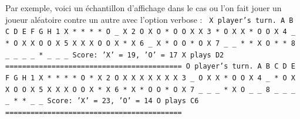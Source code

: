 \documentclass{report}
\begin{document}
Par exemple, voici un échantillon d'affichage dans le cas ou l'on fait jouer un joueur aléatoire contre un autre avec l'option verbose :\newline
\texttt{\newline
X player's turn.\newline
\newline
\tabto{1 cm}A B C D E F G H
\tabto{0.62 cm}  1 X * * * * O \_ X \newline
\tabto{0.62 cm}  2 O X O * O O X X \newline
\tabto{0.62 cm}  3 * O X X * O O X \newline
\tabto{0.62 cm}  4 \_ * O X X O O X \newline
\tabto{0.62 cm}  5 X X X O O X * X \newline
\tabto{0.62 cm}  6 \_ X * O O * O X \newline
\tabto{0.62 cm}  7 \_ \_ * * X O * * \newline
\tabto{0.62 cm}  8 \_ \_ \_ \_ * \_ \_ \_ \newline
\newline
Score: 'X' = 19, 'O' = 17\newline
\newline
X plays D2\newline
==========================================\newline
\newline
O player's turn.\newline
\newline
\tabto{1 cm}A B C D E F G H
\tabto{0.62 cm}  1 X * * * * O * X \newline
\tabto{0.62 cm}  2 O X X X X X X X \newline
\tabto{0.62 cm}  3 \_ O X X * O O X \newline
\tabto{0.62 cm}  4 \_ * O X X O O X \newline
\tabto{0.62 cm}  5 X X X O O X * X \newline
\tabto{0.62 cm}  6 * X * O O * O X \newline
\tabto{0.62 cm}  7 \_ \_ \_ * X O \_ \_ \newline
\tabto{0.62 cm}  8 \_ \_ \_ \_ * * \_ \_ \newline
\newline
Score: 'X' = 23, 'O' = 14\newline
\newline
O plays C6\newline
==========================================\newline}
\end{document}
